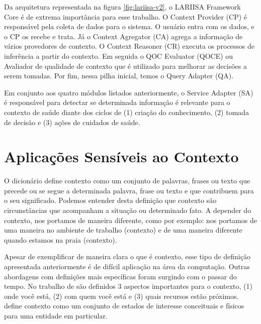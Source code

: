 Da arquitetura representada na figura \ref{fig:lariisa-v2}, o LARIISA Framework
Core é de extrema importância para esse trabalho. O Context Provider (CP) é
responsável pela coleta de dados para o sistema. O usuário entra com os dados,
e o CP os recebe e trata. Já o Context Agregator (CA) agrega a informação de
vários provedores de contexto. O Context Reasoner (CR) executa os processos de
inferência a partir do contexto. Em seguida o QOC Evaluator (QOCE) ou Avaliador
de qualidade de contexto que é utilizado para melhorar as decisões a serem
tomadas. Por fim, nessa pilha inicial, temos o Query Adapter (QA).

Em conjunto aos quatro módulos listados anteriormente, o Service Adapter (SA) é
responsável para detectar se determinada informação é relevante para o contexto
de saúde diante dos ciclos de (1) criação do conhecimento, (2) tomada de
decisão e (3) ações de cuidados de saúde.


\section{Aplicações Sensíveis ao Contexto}\label{sec:contexto}

O dicionário  define contexto como um conjunto de palavras, frases ou
texto que precede ou se segue a determinada palavra, frase ou texto e que
contribuem para o seu significado. Podemos entender desta definição que contexto
são circunstâncias que acompanham a situação ou determinado fato. A depender do
contexto, nos portamos de maneira diferente, como por exemplo: nos portamos de
uma maneira no ambiente de trabalho (contexto) e de uma maneira diferente quando
estamos na praia (contexto).


Apesar de exemplificar de maneira clara o que é contexto, esse tipo de definição
apresentada anteriormente é de difícil aplicação na área da computação.
Outras abordagens com definições mais específicas foram surgindo com o
passar do tempo. No trabalho de  são definidos 3 aspectos
importantes para o contexto, (1) onde você está, (2) com quem você está e (3)
quais recursos estão próximos.  define contexto 
como um conjunto de estados de interesse conceituais e físicos para uma entidade 
em particular.


